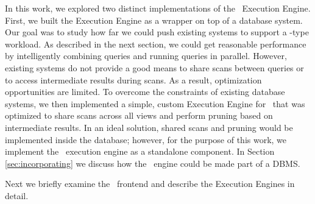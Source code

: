 In this work, we explored two distinct implementations of the \VizRecDB\ Execution
Engine. 
First, we built the Execution Engine as a wrapper on top of a database system. 
Our goal was to study how far we could push existing systems to support a
\VizRecDB-type workload.
As described in the next section, we could get reasonable performance by
intelligently combining queries and running queries in parallel. 
However, existing systems do not provide a good means to share scans between
queries or to access intermediate results during scans.
As a result, optimization opportunities are limited.
To overcome the constraints of existing database systems, we then implemented a
simple, custom Execution Engine for \VizRecDB\ that was optimized to share scans
across all views and perform pruning based on intermediate results. 
In an ideal solution, shared scans and pruning would be implemented inside the
database; however, for the purpose of this work, we implement the \VizRecDB\
execution engine as a standalone component. 
In Section \ref{sec:incorporating} we discuss how the \VizRecDB\ engine could be
made part of a DBMS.

Next we briefly examine the \VizRecDB\ frontend and describe the Execution Engines
in detail.


% 


